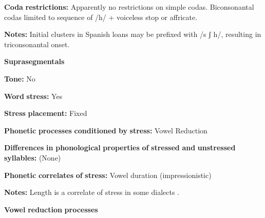 \documentclass[output=paper]{langsci/langscibook}
\begin{document}
\begin{styleBody}
\textbf{Coda} \textbf{restrictions:} Apparently no restrictions on simple codas. Biconsonantal codas limited to sequence of /h/ + voiceless stop or affricate.
\end{styleBody}

\begin{styleBody}
\textbf{Notes:} Initial clusters in Spanish loans may be prefixed with /s ʃ h/, resulting in triconsonantal onset.
\end{styleBody}

\begin{styleBody}
\textbf{Suprasegmentals}
\end{styleBody}

\begin{styleBody}
\textbf{Tone:} No
\end{styleBody}

\begin{styleBody}
\textbf{Word} \textbf{stress:} Yes
\end{styleBody}

\begin{styleBody}
\textbf{Stress} \textbf{placement:} Fixed
\end{styleBody}

\begin{styleBody}
\textbf{Phonetic} \textbf{processes} \textbf{conditioned} \textbf{by} \textbf{stress:} Vowel Reduction
\end{styleBody}

\begin{styleBody}
\textbf{Differences} \textbf{in} \textbf{phonological} \textbf{properties} \textbf{of} \textbf{stressed} \textbf{and} \textbf{unstressed} \textbf{syllables:} (None)
\end{styleBody}

\begin{styleBody}
\textbf{Phonetic} \textbf{correlates} \textbf{of} \textbf{stress:} Vowel duration (impressionistic)
\end{styleBody}

\begin{styleBody}
\textbf{Notes:} Length is a correlate of stress in some dialects \citep[23]{Polian2006}.
\end{styleBody}

\begin{styleBody}
\textbf{Vowel} \textbf{reduction} \textbf{processes}
\end{styleBody}
\end{document}
